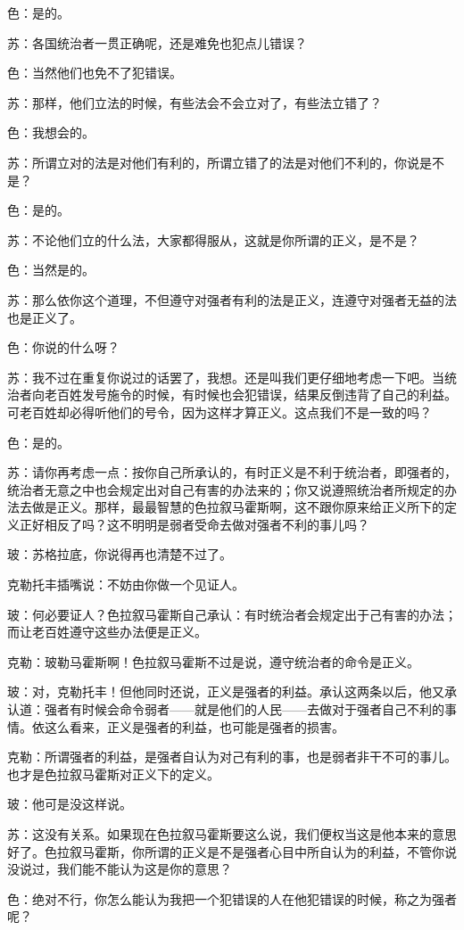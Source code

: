 \documentclass[11pt,oneside]{book}
\begin{document}
\begin{common-format}
色：是的。

苏：各国统治者一贯正确呢，还是难免也犯点儿错误？

色：当然他们也免不了犯错误。

苏：那样，他们立法的时候，有些法会不会立对了，有些法立错了？

色：我想会的。

苏：所谓立对的法是对他们有利的，所谓立错了的法是对他们不利的，你说是不是？

色：是的。

苏：不论他们立的什么法，大家都得服从，这就是你所谓的正义，是不是？

色：当然是的。

苏：那么依你这个道理，不但遵守对强者有利的法是正义，连遵守对强者无益的法也是正义了。

色：你说的什么呀？

苏：我不过在重复你说过的话罢了，我想。还是叫我们更仔细地考虑一下吧。当统治者向老百姓发号施令的时候，有时候也会犯错误，结果反倒违背了自己的利益。可老百姓却必得听他们的号令，因为这样才算正义。这点我们不是一致的吗？

色：是的。

苏：请你再考虑一点：按你自己所承认的，有时正义是不利于统治者，即强者的，统治者无意之中也会规定出对自己有害的办法来的；你又说遵照统治者所规定的办法去做是正义。那样，最最智慧的色拉叙马霍斯啊，这不跟你原来给正义所下的定义正好相反了吗？这不明明是弱者受命去做对强者不利的事儿吗？

玻：苏格拉底，你说得再也清楚不过了。

克勒托丰插嘴说：不妨由你做一个见证人。

玻：何必要证人？色拉叙马霍斯自己承认：有时统治者会规定出于己有害的办法；而让老百姓遵守这些办法便是正义。

克勒：玻勒马霍斯啊！色拉叙马霍斯不过是说，遵守统治者的命令是正义。

玻：对，克勒托丰！但他同时还说，正义是强者的利益。承认这两条以后，他又承认道：强者有时候会命令弱者——就是他们的人民——去做对于强者自己不利的事情。依这么看来，正义是强者的利益，也可能是强者的损害。

克勒：所谓强者的利益，是强者自认为对己有利的事，也是弱者非干不可的事儿。也才是色拉叙马霍斯对正义下的定义。

玻：他可是没这样说。

苏：这没有关系。如果现在色拉叙马霍斯要这么说，我们便权当这是他本来的意思好了。色拉叙马霍斯，你所谓的正义是不是强者心目中所自认为的利益，不管你说没说过，我们能不能认为这是你的意思？

色：绝对不行，你怎么能认为我把一个犯错误的人在他犯错误的时候，称之为强者呢？


\end{common-format}
\end{document}
